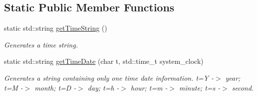 \subsection*{Static Public Member Functions}
\begin{DoxyCompactItemize}
\item 
static std\+::string \mbox{\hyperlink{classSteganoMessage_a9771a4abc2d7a5a2a8cfb1684f7f313f}{get\+Time\+String}} ()
\begin{DoxyCompactList}\small\item\em Generates a time string. \end{DoxyCompactList}\item 
static std\+::string \mbox{\hyperlink{classSteganoMessage_a9aaa5e476220c95e1a68b4d722de43b1}{get\+Time\+Date}} (char t, std\+::time\+\_\+t system\+\_\+clock)
\begin{DoxyCompactList}\small\item\em Generates a string containing only one time date information. t=Y -\/$>$ year; t=M -\/$>$ month; t=D -\/$>$ day; t=h -\/$>$ hour; t=m -\/$>$ minute; t=s -\/$>$ second. \end{DoxyCompactList}\end{DoxyCompactItemize}
